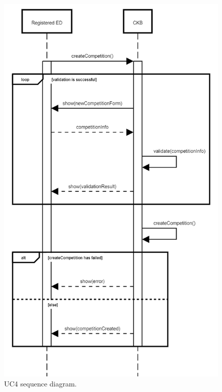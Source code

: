 \begin{center}
  \begin{figure} [H]
    \begin{center}
        \includegraphics[width=\textwidth,height=\textheight,keepaspectratio]{Images/SequenceDiagrams/UC4_new.png}
        \caption{UC4 sequence diagram.}
        \label{fig: UC4_sequence_diagram}
    \end{center}
  \end{figure}
\end{center}

